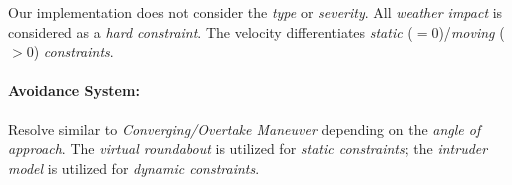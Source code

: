 \begin{note}
    Our implementation does not consider the \emph{type} or \emph{severity}. All \emph{weather impact} is considered as a \emph{hard constraint}. The velocity differentiates \emph{static} ($=0$)/\emph{moving} ($>0$) \emph{constraints}. 
\end{note}

\paragraph{Avoidance System:} Resolve similar to \emph{Converging/Overtake Maneuver} depending on the \emph{angle of approach}. The \emph{virtual roundabout} is utilized for \emph{static constraints}; the \emph{intruder model} is utilized for \emph{dynamic constraints}.
